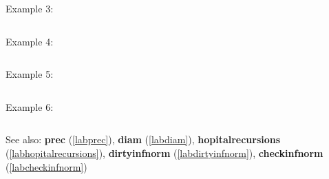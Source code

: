 \noindent Example 3: 
\begin{center}\begin{minipage}{15cm}\begin{Verbatim}[frame=single]
\end{Verbatim}
\end{minipage}\end{center}
\noindent Example 4: 
\begin{center}\begin{minipage}{15cm}\begin{Verbatim}[frame=single]
\end{Verbatim}
\end{minipage}\end{center}
\noindent Example 5: 
\begin{center}\begin{minipage}{15cm}\begin{Verbatim}[frame=single]
\end{Verbatim}
\end{minipage}\end{center}
\noindent Example 6: 
\begin{center}\begin{minipage}{15cm}\begin{Verbatim}[frame=single]
\end{Verbatim}
\end{minipage}\end{center}
See also: \textbf{prec} (\ref{labprec}), \textbf{diam} (\ref{labdiam}), \textbf{hopitalrecursions} (\ref{labhopitalrecursions}), \textbf{dirtyinfnorm} (\ref{labdirtyinfnorm}), \textbf{checkinfnorm} (\ref{labcheckinfnorm})
